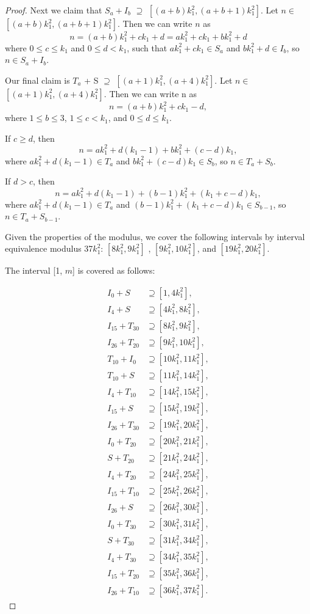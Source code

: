 \begin{proof}
Next we claim that  $S_a + I_b$ $\supseteq$ $[(a + b)k_1^2 ,  (a + b + 1)k_1^2]$. Let $n \in$ $[(a + b)k_1^2 ,  (a + b + 1)k_1^2]$.
Then we can write $n$ as 
\[
n = (a + b) k_1^2 + ck_1 + d = ak_1^2 + ck_1 + bk_1^2 + d
\]
where  $0 \leq c \leq k_1$ and $0 \leq d < k_1$, such that $ak_1^2 + ck_1 \in S_a$ and $bk_1^2 + d \in I_b$, so $n \in S_a + I_b$. 

Our final claim is $T_a$ + S $\supseteq$ $[(a +1)k_1^2 ,  (a + 4)k_1^2]$. Let $n \in$ $[(a +1)k_1^2 ,  (a + 4)k_1^2]$.
Then we can write n as 
\[
n = (a + b) k_1^2 + ck_1 - d, 
\]
where $1 \leq b \leq 3$, $1 \leq c < k_1$, and $0 \leq d \leq k_1$. 

If $c \geq d$, then
\[
n = ak_1^2 + d(k_1 - 1) + bk_1^2 + (c - d) k_1, 
\]
where $ak_1^2 + d(k_1 - 1) \in T_a$ and $bk_1^2 + (c - d)k_1 \in S_b$, so $n \in T_a + S_b$. 

If $d > c$, then
\[
n = ak_1^2 + d(k_1 - 1) + (b - 1)k_1^2 + (k_1 + c - d) k_1, 
\]
where $ak_1^2 + d(k_1 - 1) \in T_a$ and $(b - 1)k_1^2 + (k_1 + c - d)k_1 \in S_{b - 1}$, so $n \in T_a + S_{b-1}$. 



Given the properties of the modulus, we cover the following intervals by interval equivalence modulus 37$k_1^2$:  $[8k_1^2, 9k_1^2]$ , $[9k_1^2, 10k_1^2]$, and $[19k_1^2, 20k_1^2]$. 

The interval [1, $m$] is covered as follows: 

\begin{align*}
I_0 + S &\supseteq [1, 4k_1^2],\\
I_4 + S &\supseteq [4k_1^2, 8k_1^2],\\
I_{15} + T_{30}  &\supseteq [8k_1^2, 9k_1^2],\\
I_{26} + T_{20}  &\supseteq [9k_1^2, 10k_1^2],\\
T_{10} + I_{0}  &\supseteq [10k_1^2, 11k_1^2],\\
T_{10} + S  &\supseteq [11k_1^2, 14k_1^2],\\
I_{4} + T_{10}  &\supseteq [14k_1^2, 15k_1^2],\\
I_{15} + S  &\supseteq [15k_1^2, 19k_1^2],\\
I_{26} + T_{30}  &\supseteq [19k_1^2, 20k_1^2],\\
I_{0} + T_{20}  &\supseteq [20k_1^2, 21k_1^2],\\
S + T_{20}  &\supseteq [21k_1^2, 24k_1^2],\\
I_{4} + T_{20}  &\supseteq [24k_1^2, 25k_1^2],\\
I_{15} + T_{10}  &\supseteq [25k_1^2, 26k_1^2],\\
I_{26} + S  &\supseteq [26k_1^2, 30k_1^2],\\
I_{0} + T_{30}  &\supseteq [30k_1^2, 31k_1^2],\\
S + T_{30}  &\supseteq [31k_1^2, 34k_1^2],\\
I_{4} + T_{30}  &\supseteq [34k_1^2, 35k_1^2],\\
I_{15} + T_{20}  &\supseteq [35k_1^2, 36k_1^2], \\
I_{26} + T_{10}  &\supseteq [36k_1^2, 37k_1^2].
\end{align*}


\end{proof}
